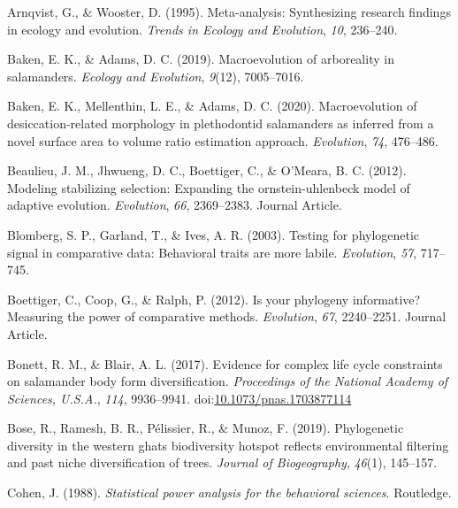 \documentclass[
]{article}
\newlength{\cslhangindent}
\newenvironment{CSLReferences}[2] %
 {%
  \setlength{\parindent}{0pt}
  \ifodd #1 \everypar{\setlength{\hangindent}{\cslhangindent}}\ignorespaces\fi
  \ifnum #2 > 0
  \setlength{\parskip}{#2\baselineskip}
  \fi
 }%
 {}
\begin{document}
\begin{CSLReferences}{1}{0}
\leavevmode{}%
Arnqvist, G., \& Wooster, D. (1995). Meta-analysis: Synthesizing
research findings in ecology and evolution. \emph{Trends in Ecology and
Evolution}, \emph{10}, 236--240.

\leavevmode{}%
Baken, E. K., \& Adams, D. C. (2019). Macroevolution of arboreality in
salamanders. \emph{Ecology and Evolution}, \emph{9}(12), 7005--7016.

\leavevmode{}%
Baken, E. K., Mellenthin, L. E., \& Adams, D. C. (2020). Macroevolution
of desiccation‐related morphology in plethodontid salamanders as
inferred from a novel surface area to volume ratio estimation approach.
\emph{Evolution}, \emph{74}, 476--486.

\leavevmode{}%
Beaulieu, J. M., Jhwueng, D. C., Boettiger, C., \& O'Meara, B. C.
(2012). Modeling stabilizing selection: Expanding the ornstein-uhlenbeck
model of adaptive evolution. \emph{Evolution}, \emph{66}, 2369--2383.
Journal Article.

\leavevmode{}%
Blomberg, S. P., Garland, T., \& Ives, A. R. (2003). Testing for
phylogenetic signal in comparative data: Behavioral traits are more
labile. \emph{Evolution}, \emph{57}, 717--745.

\leavevmode{}%
Boettiger, C., Coop, G., \& Ralph, P. (2012). Is your phylogeny
informative? Measuring the power of comparative methods.
\emph{Evolution}, \emph{67}, 2240--2251. Journal Article.

\leavevmode{}%
Bonett, R. M., \& Blair, A. L. (2017). Evidence for complex life cycle
constraints on salamander body form diversification. \emph{Proceedings
of the National Academy of Sciences, U.S.A.}, \emph{114}, 9936--9941.
doi:\href{https://doi.org/10.1073/pnas.1703877114}{10.1073/pnas.1703877114}

\leavevmode{}%
Bose, R., Ramesh, B. R., Pélissier, R., \& Munoz, F. (2019).
Phylogenetic diversity in the western ghats biodiversity hotspot
reflects environmental filtering and past niche diversification of
trees. \emph{Journal of Biogeography}, \emph{46}(1), 145--157.

\leavevmode{}%
Cohen, J. (1988). \emph{Statistical power analysis for the behavioral
sciences}. Routledge.


\end{CSLReferences}
\end{document}
